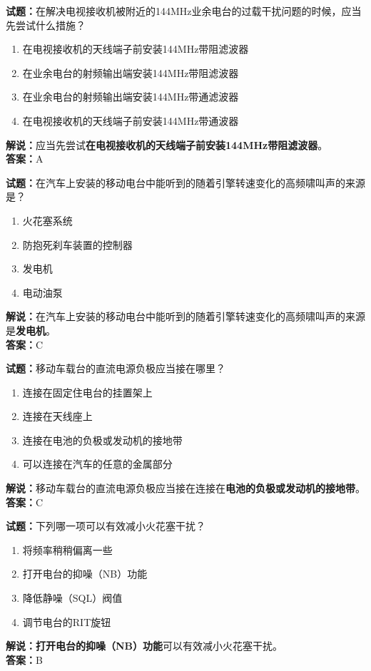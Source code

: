 \documentclass{ctexbook}
\begin{document}
\textbf{试题：}在解决电视接收机被附近的144\unit{\MHz}业余电台的过载干扰问题的时候，应当先尝试什么措施？
\begin{enumerate}[leftmargin=3em]
  \item 在电视接收机的天线端子前安装144\unit{\MHz}带阻滤波器
  \item 在业余电台的射频输出端安装144\unit{\MHz}带阻滤波器
  \item 在业余电台的射频输出端安装144\unit{\MHz}带通滤波器
  \item 在电视接收机的天线端子前安装144\unit{\MHz}带通波器
\end{enumerate}
\noindent\textbf{解说：}应当先尝试\textbf{在电视接收机的天线端子前安装144\unit{\MHz}带阻滤波器}。\\\noindent\textbf{答案：}A

\vspace{1em}

\textbf{试题：}在汽车上安装的移动电台中能听到的随着引擎转速变化的高频啸叫声的来源是？
\begin{enumerate}[leftmargin=3em]
  \item 火花塞系统
  \item 防抱死刹车装置的控制器
  \item 发电机
  \item 电动油泵
\end{enumerate}
\noindent\textbf{解说：}在汽车上安装的移动电台中能听到的随着引擎转速变化的高频啸叫声的来源是\textbf{发电机}。\\\noindent\textbf{答案：}C

\vspace{1em}

\textbf{试题：}移动车载台的直流电源负极应当接在哪里？
\begin{enumerate}[leftmargin=3em]
  \item 连接在固定住电台的挂置架上
  \item 连接在天线座上
  \item 连接在电池的负极或发动机的接地带
  \item 可以连接在汽车的任意的金属部分
\end{enumerate}
\noindent\textbf{解说：}移动车载台的直流电源负极应当接在连接在\textbf{电池的负极或发动机的接地带}。\\\noindent\textbf{答案：}C

\vspace{1em}

\textbf{试题：}下列哪一项可以有效减小火花塞干扰？
\begin{enumerate}[leftmargin=3em]
  \item 将频率稍稍偏离一些
  \item 打开电台的抑噪（NB）功能
  \item 降低静噪（SQL）阀值
  \item 调节电台的RIT旋钮
\end{enumerate}
\noindent\textbf{解说：}\textbf{打开电台的抑噪（NB）功能}可以有效减小火花塞干扰。\\\noindent\textbf{答案：}B
\end{document}
